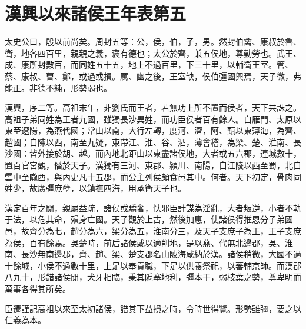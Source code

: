 \chapter{漢興以來諸侯王年表第五}
			
太史公曰，殷以前尚矣。周封五等：公，侯，伯，子，男。然封伯禽、康叔於魯、衛，地各四百里，親親之義，褒有德也；太公於齊，兼五侯地，尊勤勞也。武王、成、康所封數百，而同姓五十五，地上不過百里，下三十里，以輔衛王室。管、蔡、康叔、曹、鄭，或過或損。厲、幽之後，王室缺，侯伯彊國興焉，天子微，弗能正。非德不純，形勢弱也。

漢興，序二等。高祖末年，非劉氏而王者，若無功上所不置而侯者，天下共誅之。高祖子弟同姓為王者九國，雖獨長沙異姓，而功臣侯者百有餘人。自雁門、太原以東至遼陽，為燕代國；常山以南，大行左轉，度河、濟，阿、甄以東薄海，為齊、趙國；自陳以西，南至九疑，東帶江、淮、谷、泗，薄會稽，為梁、楚、淮南、長沙國：皆外接於胡、越。而內地北距山以東盡諸侯地，大者或五六郡，連城數十，置百官宮觀，僭於天子。漢獨有三河、東郡、潁川、南陽，自江陵以西至蜀，北自雲中至隴西，與內史凡十五郡，而公主列侯頗食邑其中。何者。天下初定，骨肉同姓少，故廣彊庶孽，以鎮撫四海，用承衛天子也。

漢定百年之閒，親屬益疏，諸侯或驕奢，忕邪臣計謀為淫亂，大者叛逆，小者不軌于法，以危其命，殞身亡國。天子觀於上古，然後加惠，使諸侯得推恩分子弟國邑，故齊分為七，趙分為六，梁分為五，淮南分三，及天子支庶子為王，王子支庶為侯，百有餘焉。吳楚時，前后諸侯或以適削地，是以燕、代無北邊郡，吳、淮南、長沙無南邊郡，齊、趙、梁、楚支郡名山陂海咸納於漢。諸侯稍微，大國不過十餘城，小侯不過數十里，上足以奉貢職，下足以供養祭祀，以蕃輔京師。而漢郡八九十，形錯諸侯閒，犬牙相臨，秉其阸塞地利，彊本干，弱枝葉之勢，尊卑明而萬事各得其所矣。

臣遷謹記高祖以來至太初諸侯，譜其下益損之時，令時世得覽。形勢雖彊，要之以仁義為本。

